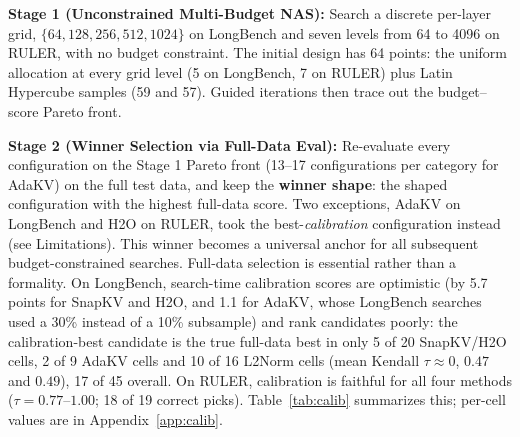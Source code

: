 \documentclass[11pt]{article}
\begin{document}
\textbf{Stage 1 (Unconstrained Multi-Budget NAS):} Search a discrete per-layer grid, $\{64,128,256,512,1024\}$ on LongBench and seven levels from 64 to 4096 on RULER, with no budget constraint. The initial design has 64 points: the uniform allocation at every grid level (5 on LongBench, 7 on RULER) plus Latin Hypercube samples (59 and 57). Guided iterations then trace out the budget--score Pareto front.

\textbf{Stage 2 (Winner Selection via Full-Data Eval):} Re-evaluate every configuration on the Stage 1 Pareto front (13--17 configurations per category for AdaKV) on the full test data, and keep the \textbf{winner shape}: the shaped configuration with the highest full-data score. Two exceptions, AdaKV on LongBench and H2O on RULER, took the best-\emph{calibration} configuration instead (see Limitations). This winner becomes a universal anchor for all subsequent budget-constrained searches. Full-data selection is essential rather than a formality. On LongBench, search-time calibration scores are optimistic (by 5.7 points for SnapKV and H2O, and 1.1 for AdaKV, whose LongBench searches used a 30\% instead of a 10\% subsample) and rank candidates poorly: the calibration-best candidate is the true full-data best in only 5 of 20 SnapKV/H2O cells, 2 of 9 AdaKV cells and 10 of 16 L2Norm cells (mean Kendall $\tau \approx 0$, $0.47$ and $0.49$), 17 of 45 overall. On RULER, calibration is faithful for all four methods ($\tau = 0.77$--$1.00$; 18 of 19 correct picks). Table~\ref{tab:calib} summarizes this; per-cell values are in Appendix~\ref{app:calib}.
\end{document}
